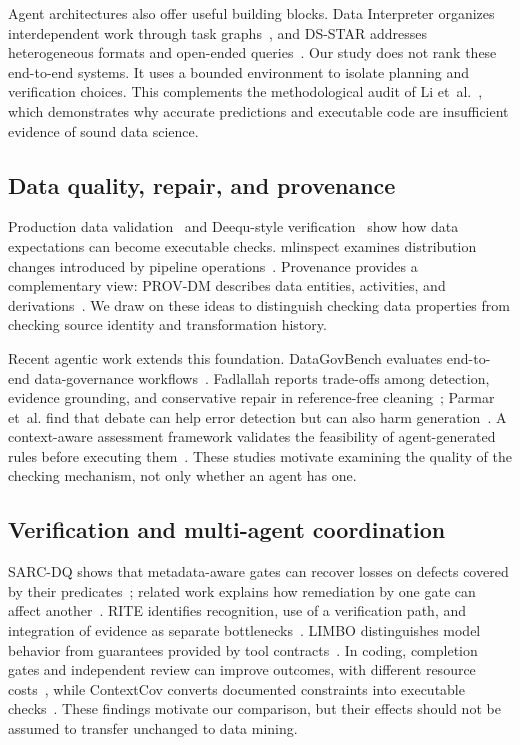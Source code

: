 \documentclass[conference]{IEEEtran}
\begin{document}
Agent architectures also offer useful building blocks. Data Interpreter organizes interdependent work through task graphs~\cite{hong2024datainterpreter}, and DS-STAR addresses heterogeneous formats and open-ended queries~\cite{nam2025dsstar}. Our study does not rank these end-to-end systems. It uses a bounded environment to isolate planning and verification choices. This complements the methodological audit of Li et~al.~\cite{li2026silent}, which demonstrates why accurate predictions and executable code are insufficient evidence of sound data science.

\subsection{Data quality, repair, and provenance}
Production data validation~\cite{polyzotis2019datavalidation} and Deequ-style verification~\cite{schelter2018deequ} show how data expectations can become executable checks. mlinspect examines distribution changes introduced by pipeline operations~\cite{grafberger2021mlinspect}. Provenance provides a complementary view: PROV-DM describes data entities, activities, and derivations~\cite{w3c2013provdm}. We draw on these ideas to distinguish checking data properties from checking source identity and transformation history.

Recent agentic work extends this foundation. DataGovBench evaluates end-to-end data-governance workflows~\cite{liu2025datagovbench}. Fadlallah reports trade-offs among detection, evidence grounding, and conservative repair in reference-free cleaning~\cite{fadlallah2026cleaning}; Parmar et~al. find that debate can help error detection but can also harm generation~\cite{parmar2026debate}. A context-aware assessment framework validates the feasibility of agent-generated rules before executing them~\cite{fadlallah2026dqa}. These studies motivate examining the quality of the checking mechanism, not only whether an agent has one.

\subsection{Verification and multi-agent coordination}
SARC-DQ shows that metadata-aware gates can recover losses on defects covered by their predicates~\cite{besanson2026sarcdq}; related work explains how remediation by one gate can affect another~\cite{besanson2026onegate}. RITE identifies recognition, use of a verification path, and integration of evidence as separate bottlenecks~\cite{zhang2026rite}. LIMBO distinguishes model behavior from guarantees provided by tool contracts~\cite{li2026limbo}. In coding, completion gates and independent review can improve outcomes, with different resource costs~\cite{zhang2026rethinking}, while ContextCov converts documented constraints into executable checks~\cite{sharma2026contextcov}. These findings motivate our comparison, but their effects should not be assumed to transfer unchanged to data mining.
\end{document}
